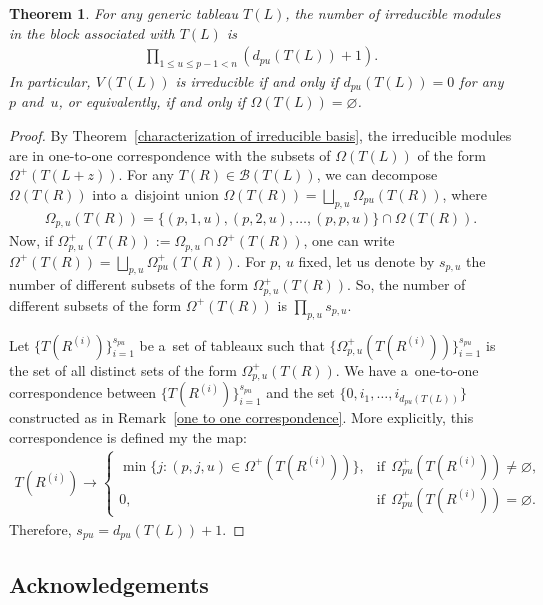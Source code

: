 \documentclass[pdftex]{sigma}
\numberwithin{equation}{section}
\newtheorem{Theorem}{Theorem}[section]
\begin{document}
\begin{Theorem}
For any generic tableau $T(L)$, the number of irreducible modules in the block associated with $T(L)$ is
\begin{gather*}
\prod\limits_{1\leq u\leq p-1< n}(d_{pu}(T(L))+1).
\end{gather*}
In particular, $V(T(L))$ is irreducible if and only if $d_{pu}(T(L))=0$ for any~$p$ and~$u$, or equivalently, if and
only if $\Omega(T(L))=\varnothing$.
\end{Theorem}
\begin{proof}
By Theorem~\ref{characterization of irreducible basis}, the irreducible modules are in one-to-one correspondence with
the subsets of $\Omega(T(L))$ of the form $\Omega^{+}(T(L+z))$.
For any $T(R)\in\mathcal{B}(T(L))$, we can decompose $\Omega(T(R))$ into a~disjoint union
$\Omega(T(R))=\bigsqcup_{p,u}\Omega_{pu}(T(R))$, where
\begin{gather*}
\Omega_{p,u}(T(R))=\{(p,1,u),(p,2,u),\ldots,(p,p,u)\}\cap \Omega(T(R)).
\end{gather*}
Now, if $\Omega^{+}_{p,u}(T(R)):=\Omega_{p,u}\cap\Omega^{+}(T(R))$, one can write
$\Omega^{+}(T(R))=\bigsqcup_{p,u}\Omega^{+}_{pu}(T(R))$.
For $p$, $u$ f\/ixed, let us denote by $s_{p,u}$ the number of dif\/ferent subsets of the form $\Omega^{+}_{p,u}(T(R))$.
So, the number of dif\/ferent subsets of the form $\Omega^{+}(T(R))$ is $\prod\limits_{p,u}s_{p,u}$.

Let $\{T(R^{(i)})\}_{i=1}^{s_{pu}}$ be a~set of tableaux such that $\{\Omega^{+}_{p,u}(T(R^{(i)}))\}_{i=1}^{s_{pu}}$ is
the set of all distinct sets of the form $\Omega^{+}_{p,u}(T(R))$.
We have a~one-to-one correspondence between $\{T(R^{(i)})\}_{i=1}^{s_{pu}}$ and the set
$\{0,i_{1},\ldots,i_{d_{pu}(T(L))}\}$ constructed as in Remark~\ref{one to one correspondence}.
More explicitly, this correspondence is def\/ined my the map:
\begin{gather*}
T(R^{(i)})\to
\begin{cases}
\min\{j: (p,j,u)\in\Omega^{+}(T(R^{(i)}))\}, & \text{if} \ \ \Omega^{+}_{pu}(T(R^{(i)}))\neq \varnothing,
\\
0, & \text{if} \ \ \Omega^{+}_{pu}(T(R^{(i)}))= \varnothing.
\end{cases}
\end{gather*}
Therefore, $s_{pu}=d_{pu}(T(L))+1$.
\end{proof}

\subsection*{Acknowledgements}
\end{document}

